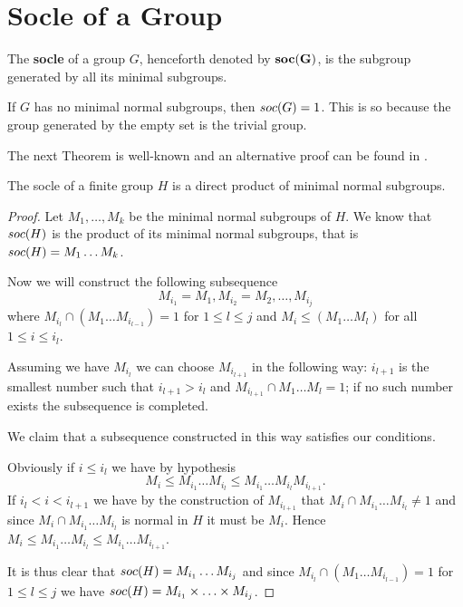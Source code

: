 \section{Socle of a Group}

\begin{definition}
    The \textbf{socle} of a group $G$, henceforth denoted by $\mathbf{soc {(G)}}$, is the subgroup generated by all its minimal subgroups.
\end{definition}

If $G$ has no minimal normal subgroups, then $soc {(G)} = 1$. This is so because the group generated by the empty set is the trivial group.

The next Theorem is well-known and an alternative proof can be found in \cite[p.~87]{RobinsonCTG}. 
\begin{theorem}
    The socle of a finite group $H$ is a direct product of minimal normal subgroups.
\end{theorem}

\begin{proof}
    Let $M_1,\ldots ,M_k$ be the minimal normal subgroups of $H$. We know that $soc {(H)}$ is the product of its minimal normal subgroups, that is $soc {(H)} = M_1\ldots M_k$.

    Now we will construct the following subsequence $$M_{i_1} = M_1, M_{i_2} = M_2, \ldots , M_{i_j}$$ where $M_{i_l} \cap (M_1\ldots M_{i_{l-1}}) = 1$ for $1 \le l \le j$ and $M_i \le (M_1\ldots M_{l})$ for all $1 \le i \le i_l$.

    Assuming we have $M_{i_l}$ we can choose $M_{i_{l+1}}$ in the following way: $i_{l+1}$ is the smallest number such that $i_{l+1} > i_l$ and $M_{i_{l+1}} \cap M_1\ldots M_l = 1$; if no such number exists the subsequence is completed.

    We claim that a subsequence constructed in this way satisfies our conditions.
    
    Obviously if $i \le i_l$ we have by hypothesis 
    $$
    M_i \le M_{i_1}\ldots M_{i_l} \le M_{i_1}\ldots M_{i_l}M_{i_{l+1}}.
    $$ 
    If $i_l < i < i_{l+1}$ we have by the construction of $M_{i_{l+1}}$ that $M_i \cap M_{i_1}\ldots M_{i_l} \ne 1$ and since $M_i \cap M_{i_1}\ldots M_{i_l}$ is normal in $H$ it must be $M_i$. Hence $M_i \le M_{i_1}\ldots M_{i_l} \le M_{i_1}\ldots M_{i_{l+1}}$.

    It is thus clear that $soc {(H)} = M_{i_1}\ldots M_{i_j}$ and since $M_{i_l} \cap (M_1\ldots M_{i_{l-1}}) = 1$ for $1 \le l \le j$ we have $soc {(H)} = M_{i_1}\times \ldots  \times M_{i_j}$.
\end{proof}

